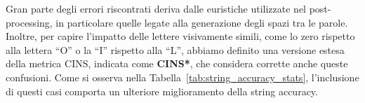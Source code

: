 Gran parte degli errori riscontrati deriva dalle euristiche utilizzate nel post-processing, in particolare quelle legate alla generazione degli spazi tra le parole.  
Inoltre, per capire l'impatto delle lettere visivamente simili, come lo zero rispetto alla lettera “O” o la “I” rispetto alla “L”, abbiamo definito una versione estesa della metrica CINS, indicata come \textbf{CINS*}, che considera corrette anche queste confusioni.  
Come si osserva nella Tabella~\ref{tab:string_accuracy_stats}, l'inclusione di questi casi comporta un ulteriore miglioramento della string accuracy.